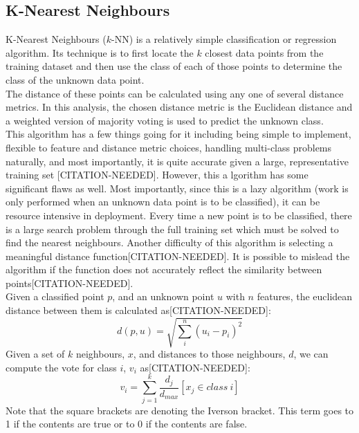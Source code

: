 \documentclass[titlepage]{article}
\begin{document}
\subsection{K-Nearest Neighbours}
K-Nearest Neighbours ($k$-NN) is a relatively simple classification or regression algorithm. Its technique is to first locate the $k$ closest data points from the training dataset and then use the class of each of those points to determine the class of the unknown data point.\\
The distance of these points can be calculated using any one of several distance metrics. In this analysis, the chosen distance metric is the Euclidean distance and a weighted version of majority voting is used to predict the unknown class.\\
This algorithm has a few things going for it including being simple to implement, flexible to feature and distance metric choices, handling multi-class problems naturally, and most importantly, it is quite accurate given a large, representative training set [CITATION-NEEDED]. However, this a lgorithm has some significant flaws as well. Most importantly, since this is a lazy algorithm (work is only performed when an unknown data point is to be classified), it can be resource intensive in deployment. Every time a new point is to be classified, there is a large search problem through the full training set which must be solved to find the nearest neighbours. Another difficulty of this algorithm is selecting a meaningful distance function[CITATION-NEEDED]. It is possible to mislead the algorithm if the function does not accurately reflect the similarity between points[CITATION-NEEDED].\\
Given a classified point $p$, and an unknown point $u$ with $n$ features, the euclidean distance between them is calculated as[CITATION-NEEDED]: 
$$d(p, u) = \sqrt{\sum\limits_i^n(u_i - p_i)^2}$$
Given a set of $k$ neighbours, $x$, and distances to those neighbours, $d$, we can compute the vote for class $i$, $v_i$ as[CITATION-NEEDED]:
$$v_i = \sum\limits_{j=1}^{k} \frac{d_j}{d_{max}} \left[x_j \in class~i\right]$$
Note that the square brackets are denoting the Iverson bracket. This term goes to 1 if the contents are true or to 0 if the contents are false.
\end{document}
